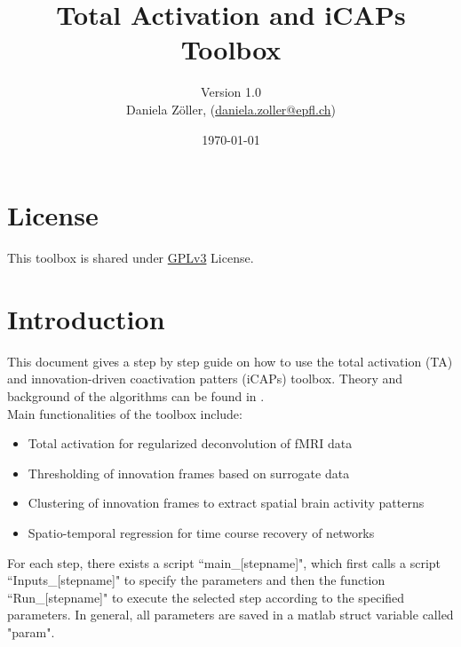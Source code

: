 \documentclass{article}
\newcommand{\texcountinc}{%
  \immediate\write18{texcount -inc \jobname.tex > \jobname.wcdetail }%
}
\begin{document}

\title{Total Activation and iCAPs Toolbox}
\author{Version 1.0\\Daniela Zöller, (\href{daniela.zoller@epfl.ch}{daniela.zoller@epfl.ch})}
\date{\today}

\maketitle

\tableofcontents


\section{License}
This toolbox is shared under \href{https://opensource.org/licenses/gpl-3.0}{GPLv3} License. %

\section{Introduction}
This document gives a step by step guide on how to use the total activation (TA) and innovation-driven coactivation patters (iCAPs) toolbox. Theory and background of the algorithms can be found in \cite{Karahanoglu2011,Karahanoglu2013,Karahanoglu2015,Farouj2017,Zoller2018}.\\
Main functionalities of the toolbox include:
\begin{itemize}
\item Total activation for regularized deconvolution of fMRI data
\item Thresholding of innovation frames based on surrogate data
\item Clustering of innovation frames to extract spatial brain activity patterns
\item Spatio-temporal regression for time course recovery of networks
\end{itemize}

For each step, there exists a script ``main\_[stepname]", which first calls a script ``Inputs\_[stepname]" to specify the parameters and then the function ``Run\_[stepname]" to execute the selected step according to the specified parameters. In general, all parameters are saved in a matlab struct variable called "param".
\end{document}
